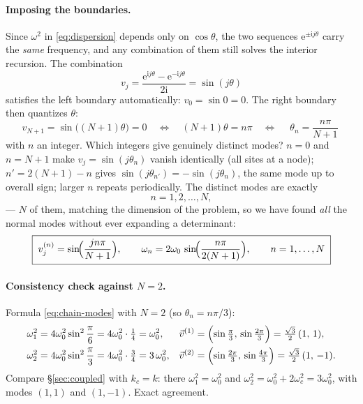 \documentclass[11pt]{article}
\theoremstyle{plain}
\theoremstyle{definition}
\theoremstyle{remark}
\newcommand{\ee}{\mathrm{e}}
\newcommand{\ii}{\mathrm{i}}
\begin{document}
\paragraph{Imposing the boundaries.}
Since $\omega^2$ in \eqref{eq:dispersion} depends only on $\cos\theta$, the
two sequences $\ee^{\pm\ii j\theta}$ carry the \emph{same} frequency, and any
combination of them still solves the interior recursion. The combination
\begin{equation}
  v_j = \frac{\ee^{\ii j\theta} - \ee^{-\ii j\theta}}{2\ii} = \sin(j\theta)
\end{equation}
satisfies the left boundary automatically: $v_0 = \sin 0 = 0$. The right
boundary then quantizes $\theta$:
\begin{equation}
  v_{N+1} = \sin\bigl((N+1)\theta\bigr) = 0
  \quad\Longleftrightarrow\quad
  (N+1)\theta = n\pi
  \quad\Longleftrightarrow\quad
  \boxed{\;\theta_n = \frac{n\pi}{N+1}\;}
\end{equation}
with $n$ an integer. Which integers give genuinely distinct modes? $n=0$ and
$n = N+1$ make $v_j = \sin(j\theta_n)$ vanish identically (all sites at a
node); $n' = 2(N+1)-n$ gives $\sin(j\theta_{n'}) = -\sin(j\theta_n)$, the
same mode up to overall sign; larger $n$ repeats periodically. The distinct
modes are exactly
\begin{equation}
  n = 1, 2, \dots, N ,
\end{equation}
--- $N$ of them, matching the dimension of the problem, so we have found
\emph{all} the normal modes without ever expanding a determinant:
\begin{equation}
  \boxed{\;
  v^{(n)}_j = \sin\!\Bigl(\frac{jn\pi}{N+1}\Bigr),
  \qquad
  \omega_n = 2\omega_0\,\sin\!\Bigl(\frac{n\pi}{2(N+1)}\Bigr),
  \qquad n = 1,\dots,N
  \;}
  \label{eq:chain-modes}
\end{equation}

\paragraph{Consistency check against $N=2$.}
Formula \eqref{eq:chain-modes} with $N=2$ (so $\theta_n = n\pi/3$):
\begin{align}
  \omega_1^2 &= 4\omega_0^2\sin^2\frac{\pi}{6} = 4\omega_0^2\cdot\tfrac14 = \omega_0^2,
  &
  \vec v^{(1)} &= \Bigl(\sin\tfrac{\pi}{3},\, \sin\tfrac{2\pi}{3}\Bigr)
  = \tfrac{\sqrt3}{2}\,(1,\,1),
  \\
  \omega_2^2 &= 4\omega_0^2\sin^2\frac{\pi}{3} = 4\omega_0^2\cdot\tfrac34 = 3\,\omega_0^2,
  &
  \vec v^{(2)} &= \Bigl(\sin\tfrac{2\pi}{3},\, \sin\tfrac{4\pi}{3}\Bigr)
  = \tfrac{\sqrt3}{2}\,(1,\,-1).
\end{align}
Compare \S\ref{sec:coupled} with $k_c = k$: there
$\omega_1^2 = \omega_0^2$ and
$\omega_2^2 = \omega_0^2 + 2\omega_c^2 = 3\omega_0^2$, with modes $(1,1)$ and
$(1,-1)$. Exact agreement.
\end{document}

